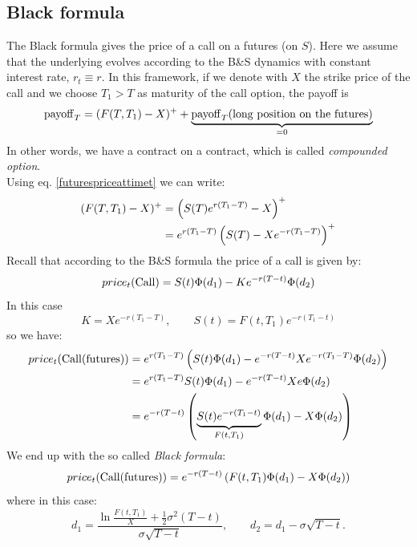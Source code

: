 \subsection{Black formula} %
The Black formula gives the price of a call on a futures (on $S$). Here we assume that the underlying evolves according to the B\&S dynamics with constant interest rate, $r_t \equiv r$. In this framework, if we denote with $X$ the strike price of the call and we choose $T_1 > T$ as maturity of the call option, the payoff is
\begin{equation}
    \operatorname{payoff}_T = (F(T,T_1) - X)^+ + \underbrace{\operatorname{payoff}_T(\text{long position on the futures})}_{=0}
\end{equation}
In other words, we have a contract on a contract, which is called \emph{compounded option}. \\
Using eq. \eqref{futurespriceattimet} we can write:
\begin{align}
    \notag (F(T,T_1) - X)^+ &= \left(S(T)e^{r(T_1-T)} - X\right)^+ \\
    &=
    e^{r(T_1-T)}\left(S(T)-Xe^{-r(T_1-T)}\right)^+
\end{align}
Recall that according to the B\&S formula the price of a call is given by:
\begin{equation*}
    price_t(\operatorname{Call}) = S(t)\Phi(d_1)-Ke^{-r(T-t)}\Phi(d_2)
\end{equation*}
In this case
\begin{equation*}
    K = Xe^{-r(T_1-T)}, \qquad S(t) = F(t,T_1)e^{-r(T_1-t)}
\end{equation*}
so we have:
\begin{align*}
    price_t(\operatorname{Call}(\operatorname{futures})) &= e^{r(T_1-T)} \left(S(t)\Phi(d_1)-e^{-r(T-t)}Xe^{-r(T_1-T)}\Phi(d_2)\right) \\
    &=
    e^{r(T_1-T)}S(t)\Phi(d_1)-e^{-r(T-t)}Xe\Phi(d_2) \\
    &=
    e^{-r(T-t)}\left(\underbrace{S(t)e^{-r(T_1-t)}}_{F(t,T_1)}\Phi(d_1) - X\Phi(d_2)\right)
\end{align*}
We end up with the so called \emph{Black formula}:
\begin{equation}
    price_t(\operatorname{Call}(\operatorname{futures})) = e^{-r(T-t)}\left(F(t,T_1)\Phi(d_1) - X\Phi(d_2)\right)
\end{equation}
where in this case:
\begin{equation}
    d_1 = \dfrac{\ln\frac{F(t,T_1)}{X}+\frac{1}{2}\sigma^2(T-t)}{\sigma\sqrt{T-t}}, \qquad d_2 = d_1 - \sigma\sqrt{T-t}. %
\end{equation}
